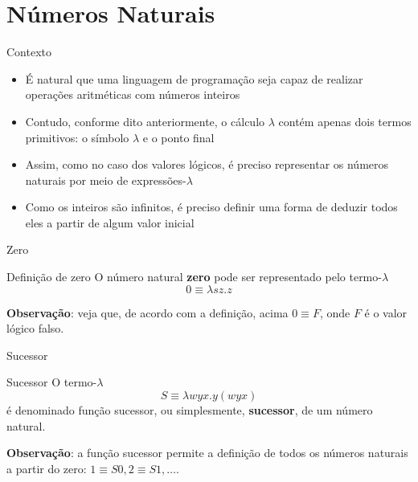 \section{Números Naturais}

\begin{frame}[fragile]{Contexto}

    \begin{itemize}
        \item É natural que uma linguagem de programação seja capaz de realizar operações
            aritméticas com números inteiros

        \item Contudo, conforme dito anteriormente, o cálculo $\lambda$ contém apenas dois
            termos primitivos: o símbolo $\lambda$ e o ponto final

        \item Assim, como no caso dos valores lógicos, é preciso representar os números naturais
            por meio de expressões-$\lambda$

        \item Como os inteiros são infinitos, é preciso definir uma forma de deduzir todos eles
            a partir de algum valor inicial
    \end{itemize}

\end{frame}

\begin{frame}[fragile]{Zero}

    \begin{block}{Definição de zero}
        O número natural \textbf{zero} pode ser representado pelo termo-$\lambda$
        \[
            0 \equiv \lambda sz.z
        \]
    \end{block}

    \vspace{0.1in}

    \textbf{Observação}: veja que, de acordo com a definição, acima $0 \equiv F$, onde $F$ é o
        valor lógico falso.
\end{frame}

\begin{frame}[fragile]{Sucessor}

    \begin{block}{Sucessor}
        O termo-$\lambda$
        \[
            S \equiv \lambda wyx.y(wyx)
        \]
        é denominado função sucessor, ou simplesmente, \textbf{sucessor}, de um número
        natural.
    \end{block}

    \vspace{0.2in}

    \textbf{Observação}: a função sucessor permite a definição de todos os números naturais 
        a partir do zero: $1\equiv S0, 2\equiv S1, \ldots$.
\end{frame}

